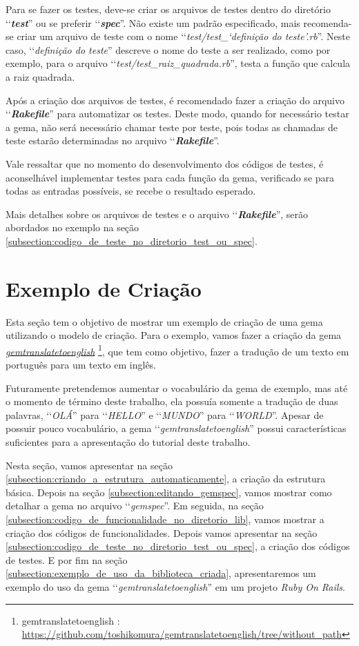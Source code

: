 Para se fazer os testes, deve-se criar os arquivos de testes dentro do diretório ‘‘\textbf{\emph{test}}'' ou se
preferir ‘‘\textbf{\emph{spec}}''. Não existe um padrão especificado, mais recomenda-se criar um arquivo de
teste com o nome ‘‘\emph{test/test\_‘definição do teste'.rb}''. Neste caso, ‘‘\emph{definição do teste}''
descreve o nome do teste a ser realizado, como por exemplo, para o arquivo
‘‘\emph{test/test\_raiz\_quadrada.rb}'', testa a função que calcula a raiz quadrada.

Após a criação dos arquivos de testes, é recomendado fazer a criação do arquivo ‘‘\textbf{\emph{Rakefile}}'' para
automatizar os testes. Deste modo, quando for necessário testar a gema, não será necessário chamar teste
por teste, pois todas as chamadas de teste estarão determinadas no arquivo ‘‘\textbf{\emph{Rakefile}}''.

Vale ressaltar que no momento do desenvolvimento dos códigos de testes, é aconselhável implementar testes
para cada função da gema, verificado se para todas as entradas possíveis, se recebe o resultado
esperado.

Mais detalhes sobre os arquivos de testes e o arquivo ‘‘\textbf{\emph{Rakefile}}'', serão abordados no exemplo
na seção \ref{subsection:codigo_de_teste_no_diretorio_test_ou_spec}.


\section{Exemplo de Criação}
\label{section:exemplo_de_criação}


Esta seção tem o objetivo de mostrar um exemplo de criação de uma gema utilizando o modelo de criação.
Para o exemplo, vamos fazer a criação da gema
\emph{\href{https://github.com/toshikomura/gemtranslatetoenglish/tree/without_path}{gemtranslatetoenglish}}
\footnote{gemtranslatetoenglish : \url{https://github.com/toshikomura/gemtranslatetoenglish/tree/without_path}},
que tem como objetivo, fazer a tradução de um texto em português para um texto em inglês.

Futuramente pretendemos aumentar o vocabulário da gema de exemplo, mas até o momento de término deste
trabalho, ela possuía somente a tradução de duas palavras, ‘‘\emph{OLÁ}'' para ‘‘\emph{HELLO}'' e
‘‘\emph{MUNDO}'' para ‘‘\emph{WORLD}''. Apesar de possuir pouco vocabulário, a gema ‘‘\emph{gemtranslatetoenglish}''
possui características suficientes para a apresentação do tutorial deste trabalho.

Nesta seção, vamos apresentar na seção \ref{subsection:criando_a_estrutura_automaticamente}, a criação da
estrutura básica. Depois na seção \ref{subsection:editando_gemspec}, vamos mostrar como detalhar a gema no
arquivo ‘‘\emph{gemspec}''. Em seguida, na seção \ref{subsection:codigo_de_funcionalidade_no_diretorio_lib},
vamos mostrar a criação dos códigos de funcionalidades. Depois vamos apresentar na seção
\ref{subsection:codigo_de_teste_no_diretorio_test_ou_spec}, a criação dos códigos de testes. E por fim na
seção \ref{subsection:exemplo_de_uso_da_biblioteca_criada}, apresentaremos um exemplo do uso da gema
‘‘\emph{gemtranslatetoenglish}'' em um projeto \emph{Ruby On Rails}.


